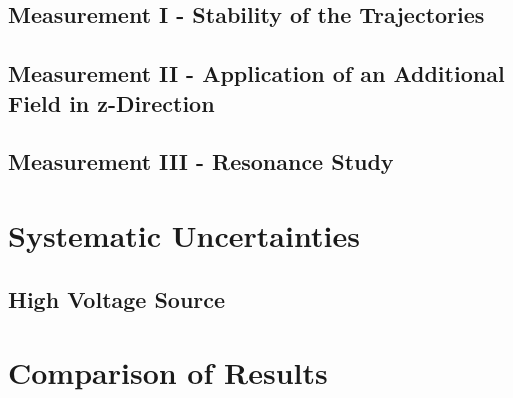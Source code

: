 \documentclass[
	paper=A4,
	parskip=full,
	chapterprefix=true,
	11pt,
	headings=normal,
	bibliography=totoc,
	listof=totoc,
	titlepage=on,
]{scrreprt}
\begin{document}
\section{Measurement I - Stability of the Trajectories}
\section{Measurement II - Application of an Additional Field in z-Direction}
\section{Measurement III - Resonance Study}

\chapter{Systematic Uncertainties}
\label{ch:systematics}
\section{High Voltage Source}
\chapter{Comparison of Results}

\cleardoublepage


{}
\end{document}
